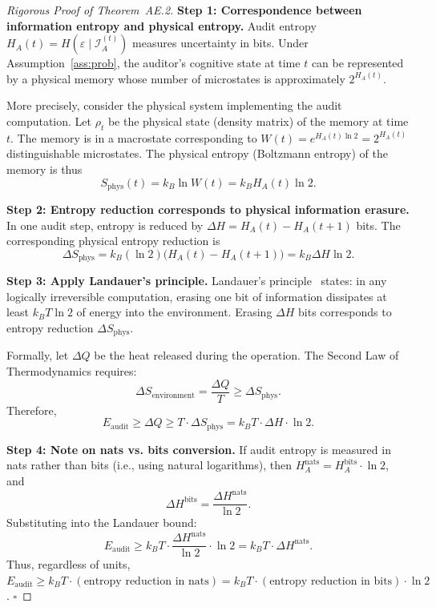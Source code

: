 \documentclass[12pt,a4paper]{article}
\newcommand{\cI}{\mathcal{I}}
\begin{document}
\begin{proof}[Rigorous Proof of Theorem~AE.2]
\textbf{Step 1: Correspondence between information entropy and physical entropy.}
Audit entropy $H_A(t) = H(\varepsilon \mid \cI_A^{(t)})$ measures uncertainty in bits. Under Assumption~\ref{ass:prob}, the auditor's cognitive state at time $t$ can be represented by a physical memory whose number of microstates is approximately $2^{H_A(t)}$.

More precisely, consider the physical system implementing the audit computation. Let $\rho_t$ be the physical state (density matrix) of the memory at time $t$. The memory is in a macrostate corresponding to $W(t) = e^{H_A(t) \ln 2} = 2^{H_A(t)}$ distinguishable microstates. The physical entropy (Boltzmann entropy) of the memory is thus
\[
S_{\mathrm{phys}}(t) = k_B \ln W(t) = k_B H_A(t) \ln 2.
\]

\textbf{Step 2: Entropy reduction corresponds to physical information erasure.}
In one audit step, entropy is reduced by $\Delta H = H_A(t) - H_A(t+1)$ bits. The corresponding physical entropy reduction is
\[
\Delta S_{\mathrm{phys}} = k_B (\ln 2) \bigl(H_A(t) - H_A(t+1)\bigr) = k_B \Delta H \ln 2.
\]

\textbf{Step 3: Apply Landauer's principle.}
Landauer's principle~\citep{landauer1961irreversibility} states: in any logically irreversible computation, erasing one bit of information dissipates at least $k_B T \ln 2$ of energy into the environment. Erasing $\Delta H$ bits corresponds to entropy reduction $\Delta S_{\mathrm{phys}}$.

Formally, let $\Delta Q$ be the heat released during the operation. The Second Law of Thermodynamics requires:
\[
\Delta S_{\mathrm{environment}} = \frac{\Delta Q}{T} \ge \Delta S_{\mathrm{phys}}.
\]
Therefore,
\[
E_{\mathrm{audit}} \ge \Delta Q \ge T \cdot \Delta S_{\mathrm{phys}} = k_B T \cdot \Delta H \cdot \ln 2.
\]

\textbf{Step 4: Note on nats vs. bits conversion.}
If audit entropy is measured in nats rather than bits (i.e., using natural logarithms), then $H_A^{\mathrm{nats}} = H_A^{\mathrm{bits}} \cdot \ln 2$, and
\[
\Delta H^{\mathrm{bits}} = \frac{\Delta H^{\mathrm{nats}}}{\ln 2}.
\]
Substituting into the Landauer bound:
\[
E_{\mathrm{audit}} \ge k_B T \cdot \frac{\Delta H^{\mathrm{nats}}}{\ln 2} \cdot \ln 2 = k_B T \cdot \Delta H^{\mathrm{nats}}.
\]
Thus, regardless of units, $E_{\mathrm{audit}} \ge k_B T \cdot (\text{entropy reduction in nats}) = k_B T \cdot (\text{entropy reduction in bits}) \cdot \ln 2$. $\square$
\end{proof}
\end{document}

